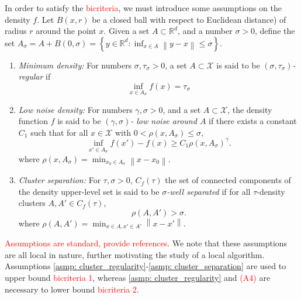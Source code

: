 \documentclass{article}
\newcommand{\diam}{\mathrm{diam}}
\newcommand{\set}[1]{\left\{#1\right\}}
\newcommand{\Reals}{\mathbb{R}}
\newcommand{\Rd}{\Reals^d}
\newcommand{\norm}[1]{\left\lVert#1\right\rVert}
\newcommand{\Asig}{A_{\sigma}}
\newcommand{\1}{\mathbf{1}}
\theoremstyle{aldenthm}
\theoremstyle{remark}
\begin{document}
In order to satisfy the \textcolor{red}{bicriteria}, we must introduce some assumptions on the density $f$. Let $B(x,r)$ be a closed ball with respect to Euclidean distance) of radius $r$ around the point $x$.  Given a set $A \subset \Rd$, and a number $\sigma > 0$, define the set $\Asig = A + B(0,\sigma) = \set{y \in \Rd: \inf_{x \in A} \norm{y - x} \leq \sigma}$. 
\begin{enumerate}[label=(A\arabic*)]
	\item 
	\label{asmp: cluster_regularity}
	\textit{Minimum density:} For numbers $\sigma, \tau_{\sigma} > 0$, a set $A \subset \mathcal{X}$ is said to be \textit{$(\sigma, \tau_{\sigma})$-regular} if
	\begin{equation}
	\inf_{x \in \Asig} f(x) = \tau_{\sigma}
	\end{equation} 
	
	\item 
	\label{asmp: low_noise_density}
	\textit{Low noise density:} For numbers $\gamma, \sigma > 0$, and a set $A \subset \mathcal{X}$, the density function $f$ is said to be \textit{$(\gamma, \sigma)$- low noise around $A$} if there exists a constant $C_1$ such that for all $x \in \mathcal{X}$ with $0 < \rho(x, \Asig) \leq \sigma$,
	\begin{equation*}
	\inf_{x' \in \Asig} f(x') - f(x) \geq C_1 \rho(x, \Asig)^{\gamma}.
	\end{equation*}
	where $\rho(x,\Asig) = \min_{x_0 \in \Asig} \norm{x - x_0}$.
	
	\item
	\label{asmp: cluster_separation}
	\textit{Cluster separation:}
	For $\tau,\sigma > 0$, $C_f(\tau)$ the set of connected components of the density upper-level set is said to be \textit{$\sigma$-well separated} if for all $\tau$-density clusters $A, A' \in C_f(\tau)$,
	\begin{equation*}
	\rho(A,A') > \sigma.
	\end{equation*}
	where $\rho(A,A') = \min_{x \in A, x' \in A'} \norm{x - x'}$.
\end{enumerate}

\textcolor{red}{Assumptions are standard, provide references.} We note that these assumptions are all local in nature, further motivating the study of a local algorithm. Assumptions \ref{asmp: cluster_regularity}-\ref{asmp: cluster_separation} are used to upper bound \textcolor{red}{bicriteria 1}, whereas \ref{asmp: cluster_regularity} and \textcolor{red}{(A4)} are necessary to lower bound \textcolor{red}{bicriteria 2}. 
\end{document}
